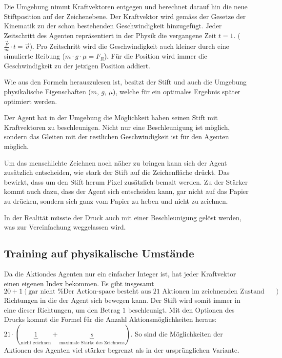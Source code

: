 Die Umgebung nimmt Kraftvektoren entgegen und berechnet darauf hin die neue
Stiftposition auf der Zeichenebene. Der Kraftvektor wird gemäss der Gesetze der
Kinematik zu der schon bestehenden Geschwindigkeit hinzugefügt. Jeder
Zeitschritt des Agenten repräsentiert in der Physik die vergangene Zeit $t=1$.
($\frac{\vec{F}}{m}\cdot t=\vec{v}$). Pro Zeitschritt wird die Geschwindigkeit
auch kleiner durch eine simulierte Reibung ($m\cdot g \cdot \mu = F_R$). Für die
Position wird immer die Geschwindigkeit zu der jetzigen Position addiert.

Wie aus den Formeln herauszulesen ist, besitzt der Stift und auch die Umgebung
physikalische Eigenschaften ($m$, $g$, $\mu$), welche für ein optimales Ergebnis
später optimiert werden.

Der Agent hat in der Umgebung die Möglichkeit haben seinen Stift mit
Kraftvektoren zu beschleunigen. Nicht nur eine Beschleunigung ist möglich,
sondern das Gleiten mit der restlichen Geschwindigkeit ist für den Agenten
möglich.

Um das menschlichte Zeichnen noch näher zu bringen kann sich der Agent
zusätzlich entscheiden, wie stark der Stift auf die Zeichenfläche drückt. Das
bewirkt, dass um den Stift herum Pixel zusätzlich bemalt werden. Zu der Stärker
kommt auch dazu, dass der Agent sich entscheiden kann, gar nicht auf das Papier
zu drücken, sondern sich ganz vom Papier zu heben und nicht zu zeichnen.

In der Realität müsste der Druck auch mit einer Beschleunigung gelöst werden,
was zur Vereinfachung weggelassen wird.

\subsection*{Training auf physikalische Umstände}



Da die Aktiondes Agenten nur ein einfacher Integer ist, hat jeder Kraftvektor
einen eigenen Index bekommen. Es gibt insgesamt $20 + 1 (\text{gar nicht     %
bewegen})$ Richtungen in die der Agent sich bewegen kann. Der Stift wird somit %
immer in eine dieser Richtungen, um den Betrag $1$ beschleunigt. Mit den
Optionen des Drucks kommt die Formel für die Anzahl Aktionsmöglichkeiten heraus:
$21\cdot(\underbrace{1}_{\text{nicht zeichnen}} + \underbrace{s}_{\text{maximale
Stärke des Zeichnens}})$. So sind die Möglichkeiten der Aktionen des Agenten
viel stärker begrenzt als in der ursprünglichen Variante. %

